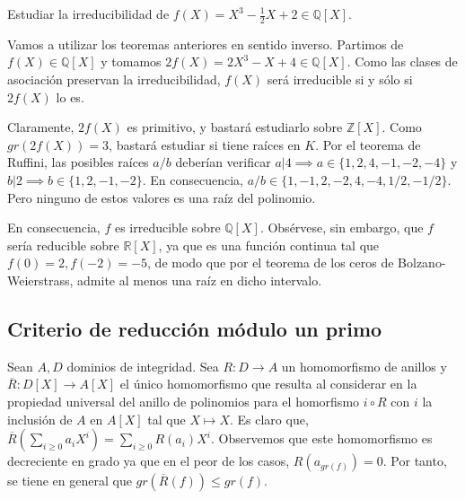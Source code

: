 \begin{example}
Estudiar la irreducibilidad de $f(X) = X^3 - \frac{1}{2}X+2 \in \mathbb{Q}[X]$. 

Vamos a utilizar los teoremas anteriores en sentido inverso. Partimos de $f(X) \in \mathbb{Q}[X]$ y tomamos $2f(X) = 2X^3 - X + 4 \in \mathbb{Q}[X]$. Como las clases de asociación preservan la irreducibilidad, $f(X)$ será irreducible si y sólo si $2f(X)$ lo es. 

Claramente, $2f(X)$ es primitivo, y bastará estudiarlo sobre $\mathbb{Z}[X]$. Como $gr(2f(X)) = 3$, bastará estudiar si tiene raíces en $K$. Por el teorema de Ruffini, las posibles raíces $a/b$ deberían verificar $a|4 \implies a \in \{1,2,4,-1,-2,-4\}$ y $b|2 \implies b \in \{1,2,-1,-2\}$. En consecuencia, $a/b \in \{1,-1,2,-2,4,-4,1/2,-1/2\}$. Pero ninguno de estos valores es una raíz del polinomio.

En consecuencia, $f$ es irreducible sobre $\mathbb{Q}[X]$. Obsérvese, sin embargo, que $f$ sería reducible sobre $\mathbb{R}[X]$, ya que es una función continua tal que $f(0) = 2,f(-2) = -5$, de modo que por el teorema de los ceros de Bolzano-Weierstrass, admite al menos una raíz en dicho intervalo. 
\end{example}

\subsection{Criterio de reducción módulo un primo}

Sean $A,D$ dominios de integridad. Sea $R:D \to A$ un homomorfismo de anillos y $\overline{R}:D[X] \to A[X]$ el único homomorfismo que resulta al considerar en la propiedad universal del anillo de polinomios para el homorfismo $i \circ R$ con $i$ la inclusión de $A$ en $A[X]$ tal que $X \mapsto X$. Es claro que, $\overline{R}(\sum_{i \ge 0} a_iX^i) = \sum_{i \ge 0} R(a_i)X^i$. Observemos que este homomorfismo es decreciente en grado ya que en el peor de los casos, $R(a_{gr(f)}) = 0$. Por tanto, se tiene en general que $gr(\overline{R}(f)) \le gr(f)$. 

